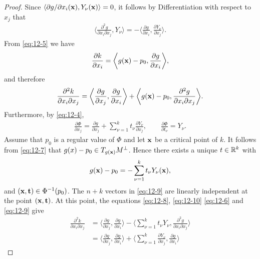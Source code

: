 \begin{proof}
  Since $\langle \partial g/\partial x_i(\mathbf{x}), Y_\nu(\mathbf{x})\rangle = 0$, it follows by Differentiation with respect to 
  $x_j$ that 
  \begin{align}\label{eq:12-6}
    \biggl\langle \frac{\partial^2 g}{\partial x_i\partial x_j}, Y_\nu\biggr\rangle 
    = -\biggl\langle \frac{\partial g}{\partial x_i}, \frac{\partial Y_\nu}{\partial x_j}\biggr\rangle.
  \end{align}
  From \eqref{eq:12-5} we have 
  \begin{align}\label{eq:12-7}
    \frac{\partial k}{\partial x_i } = \biggl\langle g(\mathbf{x})-p_0, \frac{\partial g}{\partial x_i}\biggr\rangle,
  \end{align}
  and therefore 
  \begin{align}\label{eq:12-8}
    \frac{\partial^2 k}{\partial x_i\partial x_j} 
    = \biggl\langle \frac{\partial g}{\partial x_j}, \frac{\partial g}{\partial x_i}\biggr\rangle
    + \biggl\langle g(\mathbf{x})-p_0, \frac{\partial^2 g}{\partial x_i\partial x_j}\biggr\rangle.
  \end{align}
  Furthermore, by \eqref{eq:12-4},
  \begin{align}\label{eq:12-9}
    \frac{\partial \Phi}{\partial x_j}
    = \frac{\partial g}{\partial x_j}
      + \sum_{\nu=1}^k{t_\nu\frac{\partial Y_\nu}{\partial x_j}},\qquad
    \frac{\partial \Phi}{\partial t_\nu} = Y_\nu.
  \end{align}
  Assume that $p_0$ is a regular value of $\Phi$ and let $\mathbf{x}$ be a critical point of $k$. It follows
  from \eqref{eq:12-7} that $g(x)-p_0\in T_{g(\mathbf{x})}M^\perp$. Hence there exists a unique $t\in{\ensuremath{\mathbb{R}}}^k$ with
  \begin{align}\label{eq:12-10}
    g(\mathbf{x}) - p_0 = -\sum_{\nu=1}^k{t_\nu Y_\nu(\mathbf{x})},
  \end{align}
  and $(\mathbf{x}, \mathbf{t})\in\Phi^{-1}(p_0)$. The $n+k$ vectors in \eqref{eq:12-9} are linearly independent at the 
  point $(\mathbf{x}, \mathbf{t})$. At this point, the equations \eqref{eq:12-8}, \eqref{eq:12-10} \eqref{eq:12-6} and \eqref{eq:12-9} 
  give 
  \begin{align*}
    \frac{\partial^2k}{\partial x_i\partial x_j}
    & = \biggl\langle \frac{\partial g }{\partial x_j}, \frac{\partial g}{\partial x_i}\biggr\rangle
      - \biggl\langle \sum_{\nu=1}^{k}{t_\nu Y_\nu}, \frac{\partial^2 g}{\partial x_i\partial x_j}\biggr\rangle\\
    & = \biggl\langle \frac{\partial g}{\partial x_j}, \frac{\partial g}{\partial x_i}\biggr\rangle
      + \biggl\langle \sum_{\nu=1}^{k}{\frac{\partial Y_\nu}{\partial x_j}}, \frac{\partial g}{\partial x_i} \biggr\rangle 

\end{align*}
\end{proof}
